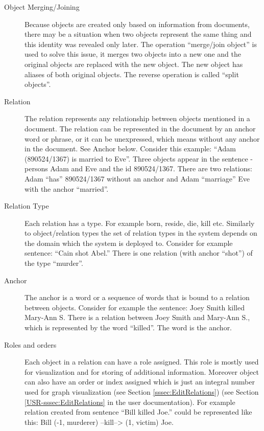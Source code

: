 \begin{description}
\item[Object Merging/Joining]
Because objects are created only based on information from documents, there may
be a situation when two objects represent the same thing and this identity was
revealed only later. The operation ``merge/join object'' is used to solve this
issue, it merges two objects into a new one and the original objects are
replaced with the new object. The new object has aliases of both original
objects. The reverse operation is called ``split objects''.

\item[Relation]
The relation represents any relationship between objects mentioned in a
document. The relation can be represented in the document by an anchor word or
phrase, or it can be unexpressed, which means without any anchor in the
document. See Anchor below.
Consider this example: ``Adam (890524/1367) is married to Eve''. Three objects
appear in the sentence - persons Adam and Eve and the id 890524/1367. There
are two relations: Adam ``has'' 890524/1367 without an anchor and Adam
``marriage'' Eve with the anchor ``married''.

\item[Relation Type]
Each relation has a type. For example born, reside, die, kill etc. Similarly to
object/relation types the set of relation types in the system depends on the
domain which the system is deployed to. Consider for example sentence: ``Cain
shot Abel.'' There is one relation (with anchor ``shot'') of the type
``murder''.

\item[Anchor]
The anchor is a word or a sequence of words that is bound to a relation between
objects. Consider for example the sentence: Joey Smith killed Mary-Ann S. There
is a relation between Joey Smith and Mary-Ann S., which is represented by the
word ``killed''. The word is the anchor.

\item[Roles and orders]
Each object in a relation can have a role assigned. This role is mostly used
for visualization and for storing of additional information. Moreover object can
also have an order or index assigned which is just an integral number used for
graph visualization\ifdefined\USRDOC{} (see Section \ref{sssec:EditRelations})
\fi{}\ifdefined\DEVDOC{} (see Section \ref{USR-sssec:EditRelations} in the user
documentation)\fi{}. For example relation created from sentence ``Bill killed
Joe.'' could be represented like this: Bill (-1, murderer) --kill--> (1, victim)
Joe.
\end{description}

